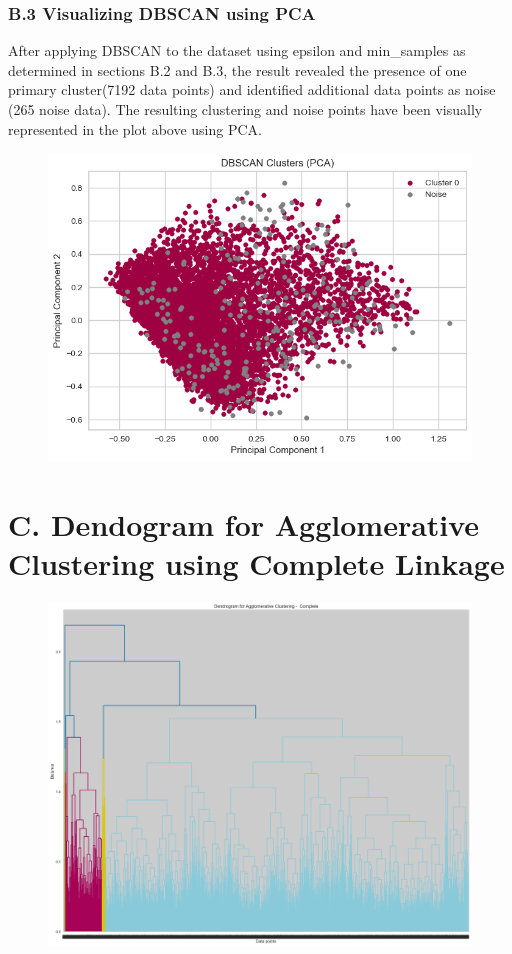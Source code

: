 \documentclass{article}
\begin{document}
\subsubsection*{B.3 Visualizing DBSCAN using PCA}
After applying DBSCAN to the dataset using epsilon and min\_samples as determined in sections B.2 and B.3, the result revealed the presence of one primary cluster(7192 data points) and identified additional data points as noise (265 noise data). The resulting clustering and noise points have been visually represented in the plot above using PCA.

\label{app:dbscan_pca}
\begin{figure}[H]
    \centering
    \includegraphics[width=0.9\linewidth]{Images/ddbscan plot.png}
\end{figure}




\section*{C. Dendogram for Agglomerative Clustering using Complete Linkage}
\label{app:completeLink}
\begin{figure}[H]
    \centering
    \includegraphics[width=0.7\linewidth]{Images/COMPLETE LINKAGE.png}
\end{figure}
\end{document}
